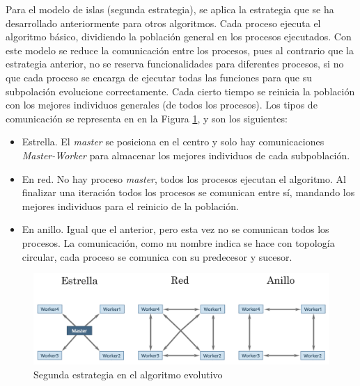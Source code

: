 	Para el modelo de islas (segunda estrategia), se aplica la estrategia que se ha desarrollado anteriormente para otros algoritmos. Cada proceso ejecuta el algoritmo básico, dividiendo la población general en los procesos ejecutados. Con este modelo se reduce la comunicación entre los procesos, pues al contrario que la estrategia anterior, no se reserva funcionalidades para diferentes procesos, si no que cada proceso se encarga de ejecutar todas las funciones para que su subpolación evolucione correctamente. Cada cierto tiempo se reinicia la población con los mejores individuos generales (de todos los procesos). Los tipos de comunicación se representa en en la Figura \ref{fig:pev3_mpi2}, y son los siguientes: 

	\begin{itemize}
		\item Estrella. El \textit{master} se posiciona en el centro y solo hay comunicaciones \textit{Master-Worker} para almacenar los mejores individuos de cada subpoblación.
		\item En red. No hay proceso \textit{master}, todos los procesos ejecutan el algoritmo. Al finalizar una iteración todos los procesos se comunican entre sí, mandando los mejores individuos para el reinicio de la población.
		\item En anillo. Igual que el anterior, pero esta vez no se comunican todos los procesos. La comunicación, como nu nombre indica se hace con topología circular, cada proceso se comunica con su predecesor y sucesor.
	\end{itemize}
	
	\begin{figure}[!h]
		\centering
		\includegraphics[width=\textwidth]{images/chapter_3/pev_mpi2}
		\caption{Segunda estrategia en el algoritmo evolutivo}
		\label{fig:pev3_mpi2}
	\end{figure}
	
